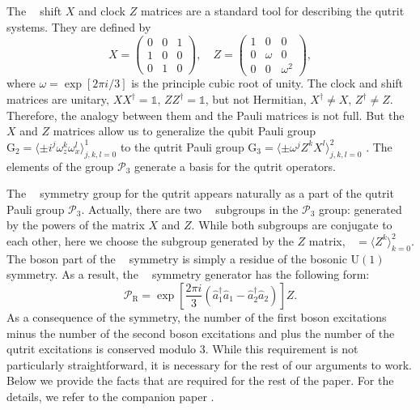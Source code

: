 \documentclass[reprint, aps, prx, amsmath, amssymb, longbibliography, superscriptaddress]{revtex4-2}
\DeclareMathOperator{\Zthree}{\mathbb{Z}_3}
\begin{document}
The $\Zthree$ shift $X$ and clock $Z$ matrices are a standard tool for describing the qutrit systems. They are defined by
\begin{equation}
\label{eq:shift-clock-matreces}
    X = \begin{pmatrix} 
         0 & 0 & 1 \\
         1 & 0 & 0 \\
         0 & 1 & 0 
        \end{pmatrix}, \quad
    Z = \begin{pmatrix}
         1 & 0 & 0 \\
         0 & \omega & 0 \\
         0 & 0 & \omega^2
        \end{pmatrix},
      \end{equation}
where $\omega = \exp[2\pi i/3]$ is the principle cubic root of unity. The clock and shift matrices are unitary, $ X X^{\dagger} = \mathbb{1}, \, Z Z^{\dagger} = \mathbb{1}$, but not Hermitian, $ X^{\dagger} \neq X, \, Z^{\dagger} \neq Z$. Therefore, the analogy between them and the Pauli matrices is not full. But the $X$ and $Z$ matrices allow us to generalize the qubit Pauli group $\mathrm{G}_2 = \langle \pm i^j \omega_z^k \omega_x^l\rangle_{j,k,l = 0}^1$ to the qutrit Pauli group $\mathrm{G}_3 = \langle \pm \omega^j Z^k X^l\rangle_{j,k,l= 0}^{2}$ \cite{gottesman_faulttolerant_1999}. The elements of the group $\mathcal{P}_3$ generate a basis for the qutrit operators.

The $\Zthree$ symmetry group for the qutrit appears naturally as a part of the qutrit Pauli group $\mathcal{P}_3$. Actually, there are two $\Zthree$ subgroups in the $\mathcal{P}_3$ group: generated by the powers of the matrix $X$ and $Z$. While both subgroups are conjugate to each other, here we choose the subgroup generated by the $Z$ matrix, $\Zthree = \langle Z^k \rangle_{k=0}^2$. The boson part of the $\Zthree$ symmetry is simply a residue of the bosonic $\mathrm{U(1)}$ symmetry. As a result, the $\Zthree$ symmetry generator has the following form:
\begin{equation}
     \mathcal{P}_{\text{R}} = \exp\left[\frac{2\pi i}{3}(\hat a_1^{\dagger}  \hat a_1 -  \hat a_2^{\dagger}  \hat a_2)\right] Z.
\end{equation}
As a consequence of the symmetry, the number of the first boson excitations minus the number of the second boson excitations and plus the number of the qutrit excitations is conserved modulo 3. While this requirement is not particularly straightforward, it is necessary for the rest of our arguments to work. Below we provide the facts that are required for the rest of the paper. For the details, we refer to the companion paper \cite{lotkov_cat_2025b}.
\end{document}
